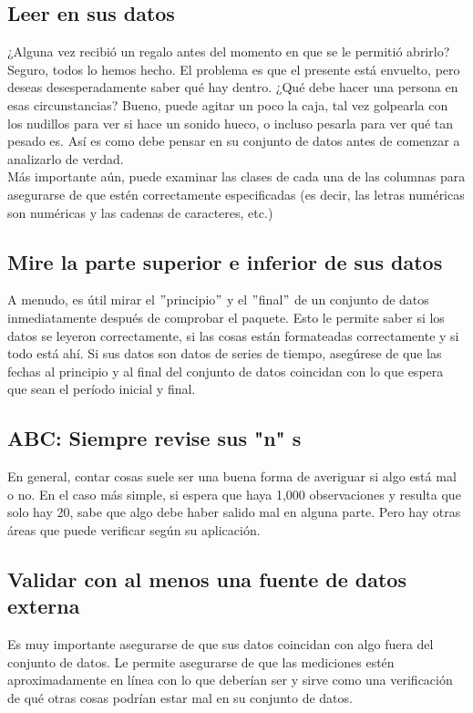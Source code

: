 \documentclass[10pt]{book}
\begin{document}
        \subsection{Leer en sus datos}
        ¿Alguna vez recibió un regalo antes del momento en que se le permitió abrirlo? Seguro, todos lo hemos hecho. El problema es que el presente está envuelto, pero deseas desesperadamente saber qué hay dentro. ¿Qué debe hacer una persona en esas circunstancias? Bueno, puede agitar un poco la caja, tal vez golpearla con los nudillos para ver si hace un sonido hueco, o incluso pesarla para ver qué tan pesado es. Así es como debe pensar en su conjunto de datos antes de comenzar a analizarlo de verdad. \\
        Más importante aún, puede examinar las clases de cada una de las columnas para asegurarse de que estén correctamente especificadas (es decir, las letras numéricas son numéricas y las cadenas de caracteres, etc.)

        \subsection{Mire la parte superior e inferior de sus datos}
        A menudo, es útil mirar el $"$principio$"$ y el $"$final$"$ de un conjunto de datos inmediatamente después de comprobar el paquete. Esto le permite saber si los datos se leyeron correctamente, si las cosas están formateadas correctamente y si todo está ahí. Si sus datos son datos de series de tiempo, asegúrese de que las fechas al principio y al final del conjunto de datos coincidan con lo que espera que sean el período inicial y final.\\

        \subsection{ABC: Siempre revise sus "n" s}
        En general, contar cosas suele ser una buena forma de averiguar si algo está mal o no. En el caso más simple, si espera que haya 1,000 observaciones y resulta que solo hay 20, sabe que algo debe haber salido mal en alguna parte. Pero hay otras áreas que puede verificar según su aplicación.

        \subsection{Validar con al menos una fuente de datos externa}
        Es muy importante asegurarse de que sus datos coincidan con algo fuera del conjunto de datos. Le permite asegurarse de que las mediciones estén aproximadamente en línea con lo que deberían ser y sirve como una verificación de qué otras cosas podrían estar mal en su conjunto de datos.\\
\end{document}
